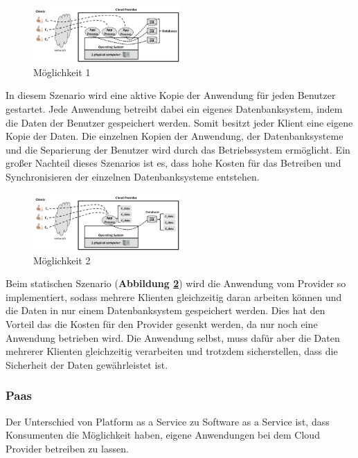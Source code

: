 \begin{figure}[H]
    \centering
	\includegraphics[width=0.5\textwidth]{Images/SaaSM1}
	\caption{Möglichkeit 1 \cite{Badger}}
	\label{SaaSM1}
\end{figure}

In diesem Szenario wird eine aktive Kopie der Anwendung für jeden Benutzer gestartet. Jede Anwendung betreibt dabei ein eigenes Datenbanksystem, indem die Daten der Benutzer gespeichert werden.
Somit besitzt jeder Klient eine eigene Kopie der Daten. Die einzelnen Kopien der Anwendung, der Datenbanksysteme und die Separierung der Benutzer wird durch das Betriebssystem ermöglicht.
Ein großer Nachteil dieses Szenarios ist es, dass hohe Kosten für das Betreiben und Synchronisieren der einzelnen Datenbanksysteme entstehen.

\begin{figure}[H]
    \centering
	\includegraphics[width=0.5\textwidth]{Images/SaaSM2}
	\caption{Möglichkeit 2 \cite{Badger}}
	\label{SaaSM2}
\end{figure}

Beim statischen Szenario (\textbf{Abbildung \ref{SaaSM2}}) wird die Anwendung vom Provider so implementiert, sodass mehrere Klienten gleichzeitig daran arbeiten können und die Daten in nur einem Datenbanksystem gespeichert werden. 
Dies hat den Vorteil das die Kosten für den Provider gesenkt werden, da nur noch eine Anwendung betrieben wird.
Die Anwendung selbst, muss dafür aber die Daten mehrerer Klienten gleichzeitig verarbeiten und trotzdem sicherstellen, dass die Sicherheit der Daten gewährleistet ist.   

\subsubsection{Paas}
Der Unterschied von Platform as a Service zu Software as a Service ist, dass Konsumenten die Möglichkeit haben, eigene Anwendungen bei dem Cloud Provider betreiben zu lassen.

